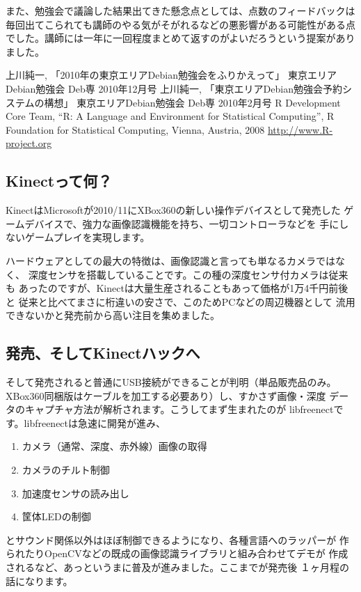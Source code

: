 \documentclass[mingoth,a4paper]{jsarticle}
\begin{document}
また、勉強会で議論した結果出てきた懸念点としては、点数のフィードバックは
毎回出てこられても講師のやる気がそがれるなどの悪影響がある可能性がある点
でした。講師には一年に一回程度まとめて返すのがよいだろうという提案があり
ました。

\begin{thebibliography}{0}
  上川純一, 「2010年の東京エリアDebian勉強会をふりかえって」
東京エリアDebian勉強会 Deb専 2010年12月号
  上川純一, 「東京エリアDebian勉強会予約システムの構想」
東京エリアDebian勉強会 Deb専 2010年2月号
 R Development Core Team, ``R: A Language and
	Environment for Statistical Computing'', R Foundation for
	Statistical Computing, Vienna, Austria, 2008 
	\url{http://www.R-project.org}
\end{thebibliography}


\subsection{Kinectって何？}

KinectはMicrosoftが2010/11にXBox360の新しい操作デバイスとして発売した
ゲームデバイスで、強力な画像認識機能を持ち、一切コントローラなどを
手にしないゲームプレイを実現します。

ハードウェアとしての最大の特徴は、画像認識と言っても単なるカメラではなく、
深度センサを搭載していることです。この種の深度センサ付カメラは従来も
あったのですが、Kinectは大量生産されることもあって価格が1万4千円前後と
従来と比べてまさに桁違いの安さで、このためPCなどの周辺機器として
流用できないかと発売前から高い注目を集めました。

\subsection{発売、そしてKinectハックへ}

そして発売されると普通にUSB接続ができることが判明（単品販売品のみ。
XBox360同梱版はケーブルを加工する必要あり）し、すかさず画像・深度
データのキャプチャ方法が解析されます。こうしてまず生まれたのが
libfreenectです。libfreenectは急速に開発が進み、
\begin{enumerate}
\item カメラ（通常、深度、赤外線）画像の取得
\item カメラのチルト制御
\item 加速度センサの読み出し
\item 筐体LEDの制御
\end{enumerate}
とサウンド関係以外はほぼ制御できるようになり、各種言語へのラッパーが
作られたりOpenCVなどの既成の画像認識ライブラリと組み合わせてデモが
作成されるなど、あっというまに普及が進みました。ここまでが発売後
１ヶ月程の話になります。
\end{document}
